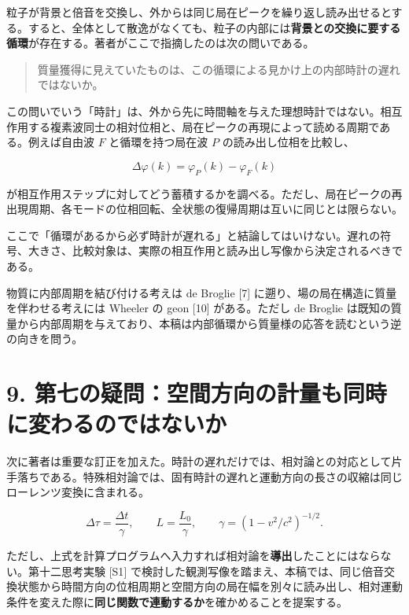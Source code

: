 \documentclass[
  a4paper,
]{ltjsarticle}
\begin{document}
粒子が背景と倍音を交換し、外からは同じ局在ピークを繰り返し読み出せるとする。すると、全体として散逸がなくても、粒子の内部には\textbf{背景との交換に要する循環}が存在する。著者がここで指摘したのは次の問いである。

\begin{quote}
質量獲得に見えていたものは、この循環による見かけ上の内部時計の遅れではないか。
\end{quote}

この問いでいう「時計」は、外から先に時間軸を与えた理想時計ではない。相互作用する複素波同士の相対位相と、局在ピークの再現によって読める周期である。例えば自由波
\(F\) と循環を持つ局在波 \(P\) の読み出し位相を比較し、

\[
\Delta\varphi(k)=\varphi_P(k)-\varphi_F(k)
\]

が相互作用ステップに対してどう蓄積するかを調べる。ただし、局在ピークの再出現周期、各モードの位相回転、全状態の復帰周期は互いに同じとは限らない。

ここで「循環があるから必ず時計が遅れる」と結論してはいけない。遅れの符号、大きさ、比較対象は、実際の相互作用と読み出し写像から決定されるべきである。

物質に内部周期を結び付ける考えは de Broglie {[}7{]}
に遡り、場の局在構造に質量を伴わせる考えには Wheeler の geon {[}10{]}
がある。ただし de Broglie
は既知の質量から内部周期を与えており、本稿は内部循環から質量様の応答を読むという逆の向きを問う。

\section{9.
第七の疑問：空間方向の計量も同時に変わるのではないか}\label{ux7b2cux4e03ux306eux7591ux554fux7a7aux9593ux65b9ux5411ux306eux8a08ux91cfux3082ux540cux6642ux306bux5909ux308fux308bux306eux3067ux306fux306aux3044ux304b}

次に著者は重要な訂正を加えた。時計の遅れだけでは、相対論との対応として片手落ちである。特殊相対論では、固有時計の遅れと運動方向の長さの収縮は同じローレンツ変換に含まれる。

\[
\Delta\tau=\frac{\Delta t}{\gamma},\qquad
L=\frac{L_0}{\gamma},\qquad
\gamma=(1-v^2/c^2)^{-1/2}.
\]

ただし、上式を計算プログラムへ入力すれば相対論を\textbf{導出}したことにはならない。第十二思考実験
{[}S1{]}
で検討した観測写像を踏まえ、本稿では、同じ倍音交換状態から時間方向の位相周期と空間方向の局在幅を別々に読み出し、相対運動条件を変えた際に\textbf{同じ関数で連動するか}を確かめることを提案する。
\end{document}
